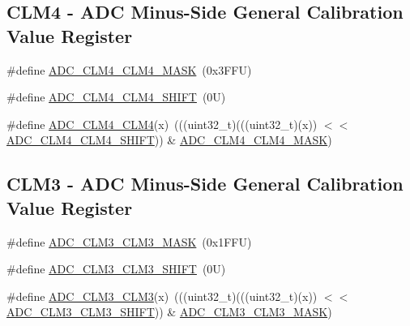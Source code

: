\subsection*{C\+L\+M4 -\/ A\+DC Minus-\/\+Side General Calibration Value Register}
\begin{DoxyCompactItemize}
\item 
\#define \mbox{\hyperlink{group___a_d_c___register___masks_ga9f8f5b63268c5b87f04ee884579a385b}{A\+D\+C\+\_\+\+C\+L\+M4\+\_\+\+C\+L\+M4\+\_\+\+M\+A\+SK}}~(0x3\+F\+F\+U)
\item 
\#define \mbox{\hyperlink{group___a_d_c___register___masks_gafa9121fc54ce9386fdc4c1d05f45d0de}{A\+D\+C\+\_\+\+C\+L\+M4\+\_\+\+C\+L\+M4\+\_\+\+S\+H\+I\+FT}}~(0\+U)
\item 
\#define \mbox{\hyperlink{group___a_d_c___register___masks_gad44edd7b22b26259838f02e5348e2449}{A\+D\+C\+\_\+\+C\+L\+M4\+\_\+\+C\+L\+M4}}(x)~(((uint32\+\_\+t)(((uint32\+\_\+t)(x)) $<$$<$ \mbox{\hyperlink{group___a_d_c___register___masks_gafa9121fc54ce9386fdc4c1d05f45d0de}{A\+D\+C\+\_\+\+C\+L\+M4\+\_\+\+C\+L\+M4\+\_\+\+S\+H\+I\+FT}})) \& \mbox{\hyperlink{group___a_d_c___register___masks_ga9f8f5b63268c5b87f04ee884579a385b}{A\+D\+C\+\_\+\+C\+L\+M4\+\_\+\+C\+L\+M4\+\_\+\+M\+A\+SK}})
\end{DoxyCompactItemize}
\subsection*{C\+L\+M3 -\/ A\+DC Minus-\/\+Side General Calibration Value Register}
\begin{DoxyCompactItemize}
\item 
\#define \mbox{\hyperlink{group___a_d_c___register___masks_ga546b5a27d980deed324add231c050a6f}{A\+D\+C\+\_\+\+C\+L\+M3\+\_\+\+C\+L\+M3\+\_\+\+M\+A\+SK}}~(0x1\+F\+F\+U)
\item 
\#define \mbox{\hyperlink{group___a_d_c___register___masks_ga9bdd0a97bea9576ea5c9eccd54c08940}{A\+D\+C\+\_\+\+C\+L\+M3\+\_\+\+C\+L\+M3\+\_\+\+S\+H\+I\+FT}}~(0\+U)
\item 
\#define \mbox{\hyperlink{group___a_d_c___register___masks_gaccf9cd66317e1c61f7daacabd0d95904}{A\+D\+C\+\_\+\+C\+L\+M3\+\_\+\+C\+L\+M3}}(x)~(((uint32\+\_\+t)(((uint32\+\_\+t)(x)) $<$$<$ \mbox{\hyperlink{group___a_d_c___register___masks_ga9bdd0a97bea9576ea5c9eccd54c08940}{A\+D\+C\+\_\+\+C\+L\+M3\+\_\+\+C\+L\+M3\+\_\+\+S\+H\+I\+FT}})) \& \mbox{\hyperlink{group___a_d_c___register___masks_ga546b5a27d980deed324add231c050a6f}{A\+D\+C\+\_\+\+C\+L\+M3\+\_\+\+C\+L\+M3\+\_\+\+M\+A\+SK}})
\end{DoxyCompactItemize}
